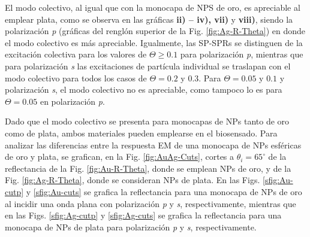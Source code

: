 El modo colectivo, al igual que con la monocapa de NPS de oro, es apreciable al emplear plata, como se observa en las gráficas \textbf{ii) -- iv), vii)} y \textbf{viii)}, siendo la polarización \emph{p} (gráficas del renglón superior de la Fig. \ref{fig:Ag-R-Theta}) en donde el modo colectivo es más apreciable. Igualmente, las SP-SPRs se distinguen de la excitación colectiva para los valores de $\Theta\geq 0.1$  para polarización \emph{p}, mientras que para polarización \emph{s} las excitaciones de partícula individual se traslapan con el modo colectivo para todos los casos de $\Theta=0.2$ y $0.3$. Para $\Theta = 0.05$ y $0.1$ y polarización \emph{s}, el modo colectivo no es apreciable, como tampoco lo es para $\Theta=0.05$ en polarización \emph{p}.

Dado que el modo colectivo se presenta para monocapas de NPs tanto de oro como de plata, ambos materiales pueden emplearse en el biosensado. Para analizar las diferencias entre la respuesta EM de una monocapa de NPs esféricas de oro y plata, se grafican, en la Fig. \ref{fig:AuAg-Cuts}, cortes a $\theta_i = 65^\circ$ de la reflectancia de la Fig. \ref{fig:Au-R-Theta}, donde se emplean NPs de oro, y de la Fig. \ref{fig:Ag-R-Theta}, donde se consideran NPs de plata. En las Figs. \ref{sfig:Au-cutp} y \ref{sfig:Au-cuts} se grafica la reflectancia para una monocapa de NPs de oro al incidir una onda plana con polarización \emph{p} y \emph{s}, respectivamente, mientras que en las Figs. \ref{sfig:Ag-cutp} y \ref{sfig:Ag-cuts} se grafica la reflectancia para una monocapa de NPs de plata para polarización \emph{p} y \emph{s}, respectivamente.

